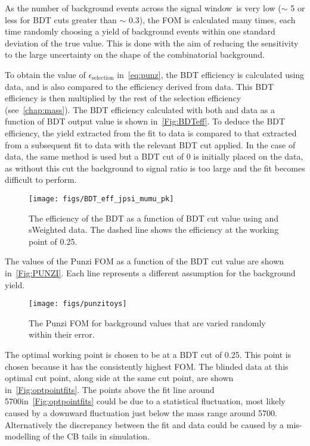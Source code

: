 As the number of background events across the signal window\
is very low ($\sim$ 5 or less for BDT cuts greater than $\sim$ 0.3), the FOM is calculated many times, each time randomly choosing a yield of background events within one standard deviation of the true value. This is done with the aim of reducing the sensitivity to the large uncertainty on the shape of the combinatorial background.

To obtain the value of $\epsilon_{\mathrm{selection}}$ in~\autoref{eq:punz}, the BDT efficiency is calculated using \LbKjpsi data, and is also compared to the efficiency derived from \LbK data. This BDT efficiency is then multiplied by the rest of the selection efficiency (see~\autoref{chap:mass}).
The BDT efficiency calculated with both \LbK and \LbKjpsi data as a function of BDT output value is shown in~\autoref{Fig:BDTeff}. To deduce the BDT efficiency, the yield extracted from the fit to \LbKjpsi data is compared to that extracted from a subsequent fit to \LbKjpsi data with the relevant BDT cut applied. In the case of \LbK data, the same method is used but a BDT cut of 0 is initially placed on the \LbK data, as without this cut the background to signal ratio is too large and the fit becomes difficult to perform.
\begin{figure}[!ht]
  \centering
  \texttt{[image: figs/BDT\_eff\_jpsi\_mumu\_pk]}
  \caption{The efficiency of the BDT as a function of BDT cut value using \LbK and \LbKjpsi sWeighted data. The dashed line shows the efficiency at the working point of 0.25.}
  \label{Fig:BDTeff}
\end{figure}

The values of the Punzi FOM as a function of the BDT cut value are shown in~\autoref{Fig:PUNZI}. Each line represents a different assumption for the background yield.
\begin{figure}[!ht]
  \centering
  \texttt{[image: figs/punzitoys]}
  \caption{The Punzi FOM for background values that are varied randomly within their error.}
  \label{Fig:PUNZI}
\end{figure}
The  optimal working point is chosen to be at a BDT cut of 0.25. This point is chosen because it has the consistently highest FOM. The blinded \Lbpi data at this optimal cut point, along side \Lbpijpsi at the same cut point, are shown in~\autoref{Fig:optpointfits}. The points above the fit line around 5700\mevcc in~\autoref{Fig:optpointfits}\protect{} could be due to a statistical fluctuation, most likely caused by a downward fluctuation just below the mass range around 5700\mevc. Alternatively the discrepancy between the fit and data could be caused by a mis-modelling of the CB tails in simulation.

